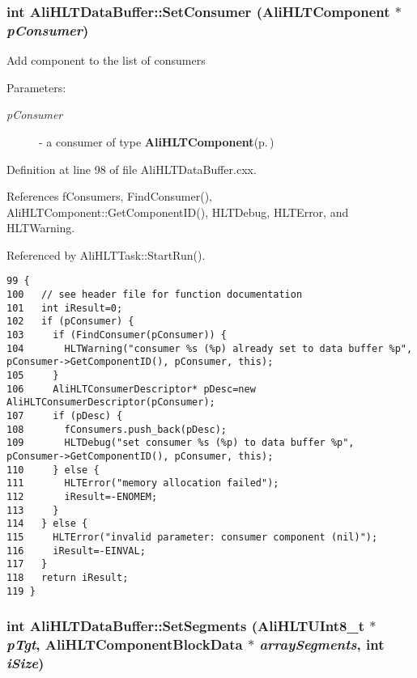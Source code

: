 \subsubsection{\setlength{\rightskip}{0pt plus 5cm}int Ali\-HLTData\-Buffer::Set\-Consumer ({\bf Ali\-HLTComponent} $\ast$ {\em p\-Consumer})}\label{classAliHLTDataBuffer_a4}


Add component to the list of consumers \begin{Desc}
\item[Parameters:]
\begin{description}
\item[{\em p\-Consumer}]- a consumer of type {\bf Ali\-HLTComponent}{\rm (p.\,\pageref{classAliHLTComponent})} \end{description}
\end{Desc}


Definition at line 98 of file Ali\-HLTData\-Buffer.cxx.

References f\-Consumers, Find\-Consumer(), Ali\-HLTComponent::Get\-Component\-ID(), HLTDebug, HLTError, and HLTWarning.

Referenced by Ali\-HLTTask::Start\-Run().

\footnotesize\begin{verbatim}99 {
100   // see header file for function documentation
101   int iResult=0;
102   if (pConsumer) {
103     if (FindConsumer(pConsumer)) {
104       HLTWarning("consumer %s (%p) already set to data buffer %p", pConsumer->GetComponentID(), pConsumer, this);
105     }
106     AliHLTConsumerDescriptor* pDesc=new AliHLTConsumerDescriptor(pConsumer);
107     if (pDesc) {
108       fConsumers.push_back(pDesc);
109       HLTDebug("set consumer %s (%p) to data buffer %p", pConsumer->GetComponentID(), pConsumer, this);
110     } else {
111       HLTError("memory allocation failed");
112       iResult=-ENOMEM;
113     }
114   } else {
115     HLTError("invalid parameter: consumer component (nil)");
116     iResult=-EINVAL;
117   }
118   return iResult;
119 }
\end{verbatim}\normalsize 


\subsubsection{\setlength{\rightskip}{0pt plus 5cm}int Ali\-HLTData\-Buffer::Set\-Segments ({\bf Ali\-HLTUInt8\_\-t} $\ast$ {\em p\-Tgt}, {\bf Ali\-HLTComponent\-Block\-Data} $\ast$ {\em array\-Segments}, int {\em i\-Size})}\label{classAliHLTDataBuffer_a9}


